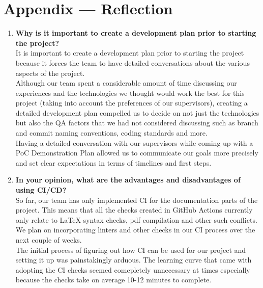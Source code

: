 \documentclass{article}
\begin{document}
\newpage{}

\section*{Appendix --- Reflection}

\begin{enumerate}
    \item \textbf{Why is it important to create a development plan prior to starting the
    project?}\\
    \newline
    It is important to create a development plan prior to starting the project because
    it forces the team to have detailed conversations about the various aspects of the project.\\
    \newline
    Although our team spent a considerable amount of time discussing our experiences and the
    technologies we thought would work the best for this project (taking into account the preferences
    of our supervisors), creating a detailed development plan compelled us to decide on not just the 
    technologies but also the QA factors that we had not considered discussing such as branch and commit 
    naming conventions, coding standards and more.\\
    \newline
    Having a detailed conversation with our supervisors while coming up with a PoC Demonstration
    Plan allowed us to communicate our goals more precisely and set clear expectations in terms of timelines
    and first steps.
    \item \textbf{In your opinion, what are the advantages and disadvantages of using
    CI/CD?}\\
    \newline
    So far, our team has only implemented CI for the documentation parts of the project. This means that
    all the checks created in GitHub Actions currently only relate to LaTeX syntax checks, pdf compilation
    and other such conflicts. We plan on incorporating linters and other checks in our CI process over the
    next couple of weeks.\\
    \newline
    The initial process of figuring out how CI can be used for our project and setting it up was painstakingly
    arduous. The learning curve that came with adopting the CI checks seemed comepletely unnecessary at times
    especially because the checks take on average 10-12 minutes to complete.\\

\end{enumerate}
\end{document}
